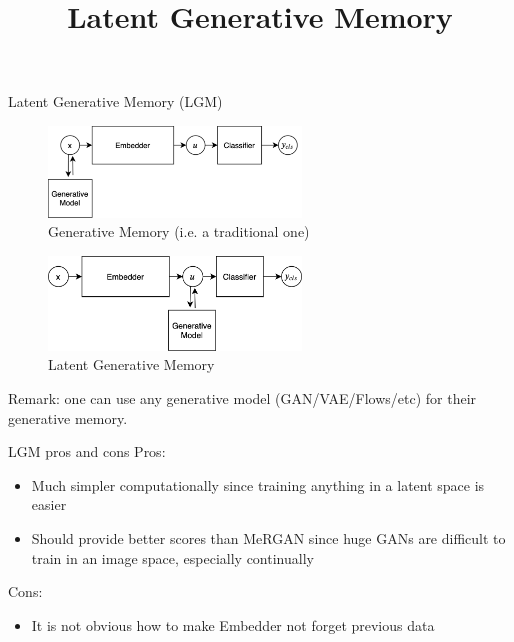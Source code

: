 \documentclass[handout, 10pt]{beamer}
\title{Latent Generative Memory}
\begin{document}
\begin{frame}
    \titlepage
\end{frame}


\begin{frame}{Latent Generative Memory (LGM)}
    \pause
    \begin{figure}
        \centering
        \includegraphics[width=0.6\textwidth]{images/GM}
        \caption{Generative Memory (i.e. a traditional one)}
    \end{figure}
    
    \pause
    \begin{figure}
        \centering
        \includegraphics[width=0.6\textwidth]{images/LGM}
        \caption{Latent Generative Memory}
    \end{figure}
    
    \pause
    Remark: one can use any generative model (GAN/VAE/Flows/etc) for their generative memory.
\end{frame}


\begin{frame}{LGM pros and cons}
    \pause Pros:
    \begin{itemize}
        \item\pause Much simpler computationally since training anything in a latent space is easier
        \item\pause Should provide better scores than MeRGAN since huge GANs are difficult to train in an image space, especially continually
    \end{itemize}
    
    \pause Cons:
    \begin{itemize}
        \item\pause It is not obvious how to make Embedder not forget previous data
    \end{itemize}
\end{frame}
\end{document}
